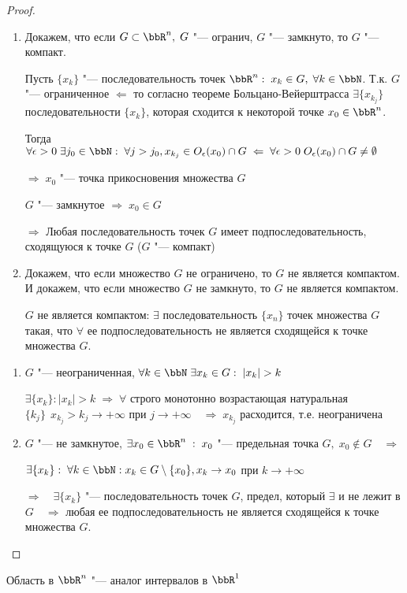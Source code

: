 \begin{proof}\leavevmode
\begin{enumerate}[wide, labelwidth=!, labelindent=\parindent]
\item
Докажем, что если $G \subset \bbR^n, \; G$ "--- огранич, $G$ "--- замкнуто, то $G$ "--- компакт.

Пусть $\{ x_k \}$ "--- последовательность точек $\bbR^n: \; x_k \in G, \; \forall k \in \bbN$. Т.к. $G$ "--- ограниченное $\Leftarrow$ то согласно теореме Больцано-Вейерштрасса $\exists \{ x_{k_j} \}$ последовательности $\{ x_k \}$, которая сходится к некоторой точке $x_0 \in \bbR^n$.

Тогда $\forall \epsilon > 0 \; \exists j_0 \in \bbN: \; \forall j > j_0, x_{k_j} \in O_\epsilon(x_0) \cap G \; \Leftarrow \; \forall \epsilon > 0 \; O_\epsilon(x_0) \cap G \not= \emptyset$

$\Rightarrow \; x_0$ "--- точка прикосновения множества $G$

$G$ "--- замкнутое $\Rightarrow \; x_0 \in G$

$\Rightarrow$ Любая последовательность точек $G$ имеет подпоследовательность, сходящуюся к точке $G$ ($G$ "--- компакт)

\item

Докажем, что если множество $G$ не ограничено, то $G$ не является компактом. И докажем, что если множество $G$ не замкнуто, то $G$ не является компактом.

$G$ не является компактом: $\exists$ последовательность $\{ x_n \}$ точек множества $G$ такая, что $\forall$ ее подпоследовательность не является сходящейся к точке множества $G$. 
\end{enumerate}

\begin{enumerate}[wide, labelwidth=!, labelindent=\parindent]
\item

$G$ "--- неограниченная, $\forall k \in \bbN \; \exists x_k \in G: \; |x_k| > k$

$\exists \{ x_k \}: |x_k| > k \; \Rightarrow \; \forall$ строго монотонно возрастающая натуральная $\{ k_j \}\ \  x_{k_j} > k_j \to +\infty$ при $j \to +\infty \quad \Rightarrow \; x_{k_j}$ расходится, т.е. неограничена 

\item

$G$ "--- не замкнутое, $\exists x_0 \in \bbR^n \;:\; x_0$ "--- предельная точка $G, \; x_0 \notin G \quad \Rightarrow$

$\exists \{ x_k \}: \; \forall k \in \bbN: x_k \in G \setminus \{ x_0 \}, x_k \to x_0$ при $k \to +\infty$

$\Rightarrow \quad \exists \{ x_k \}$ "--- последовательность точек $G$, предел, который $\exists$ и не лежит в $G \quad \Rightarrow$  любая ее подпоследовательность не является сходящейся к точке множества $G$.\qedhere
\end{enumerate}
\end{proof}
Область в $\bbR^n$ "--- аналог интервалов в $\bbR^1$

